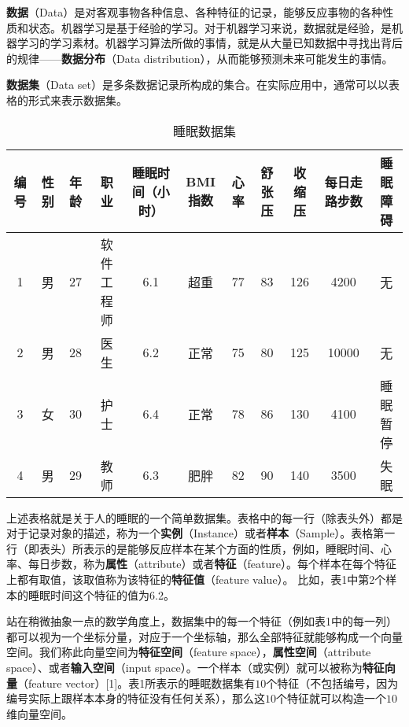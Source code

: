 

\textbf{数据}（Data）是对客观事物各种信息、各种特征的记录，能够反应事物的各种性质和状态。机器学习是基于经验的学习。对于机器学习来说，数据就是经验，是机器学习的学习素材。机器学习算法所做的事情，就是从大量已知数据中寻找出背后的规律——\textbf{数据分布}（Data distribution），从而能够预测未来可能发生的事情。

\textbf{数据集}（Data set）是多条数据记录所构成的集合。在实际应用中，通常可以以表格的形式来表示数据集。

\begin{table}[ht]
\centering
\caption{睡眠数据集}\label{tab_datast2}
\begin{tabular}{|c|c|c|c|c|c|c|c|c|c|c|}
\hline
编号 & 性别 & 年龄 & 职业 & 睡眠时间（小时） & BMI指数 & 心率 & 舒张压 & 收缩压 & 每日走路步数 & 睡眠障碍 \\\hline
1 & 男 & 27 & 软件工程师 & 6.1 & 超重 & 77 & 83 & 126 & 4200 & 无 \\
\hline
2 & 男 & 28 & 医生 & 6.2 & 正常 & 75 & 80 & 125 & 10000 & 无 \\
\hline
3 & 女 & 30 & 护士 & 6.4 & 正常 & 78 & 86 & 130 & 4100 & 睡眠暂停 \\
\hline
4 & 男 & 29 & 教师 & 6.3 & 肥胖 & 82 & 90 & 140 & 3500 & 失眠 \\
\hline
\end{tabular}
\end{table}

上述表格就是关于人的睡眠的一个简单数据集。表格中的每一行（除表头外）都是对于记录对象的描述，称为一个\textbf{实例}（Instance）或者\textbf{样本}（Sample）。表格第一行（即表头）所表示的是能够反应样本在某个方面的性质，例如，睡眠时间、心率、每日步数，称为\textbf{属性}（attribute）或者\textbf{特征}（feature）。每个样本在每个特征上都有取值，该取值称为该特征的\textbf{特征值}（feature value）。
比如，表1中第2个样本的睡眠时间这个特征的值为6.2。

站在稍微抽象一点的数学角度上，数据集中的每一个特征（例如表1中的每一列）都可以视为一个坐标分量，对应于一个坐标轴，那么全部特征就能够构成一个向量空间。我们称此向量空间为\textbf{特征空间}（feature space），\textbf{属性空间}（attribute space）、或者\textbf{输入空间}（input space）。一个样本（或实例）就可以被称为\textbf{特征向量}（feature vector）[1]。表1所表示的睡眠数据集有$10$个特征（不包括编号，因为编号实际上跟样本本身的特征没有任何关系），那么这$10$个特征就可以构造一个$10$维向量空间。

